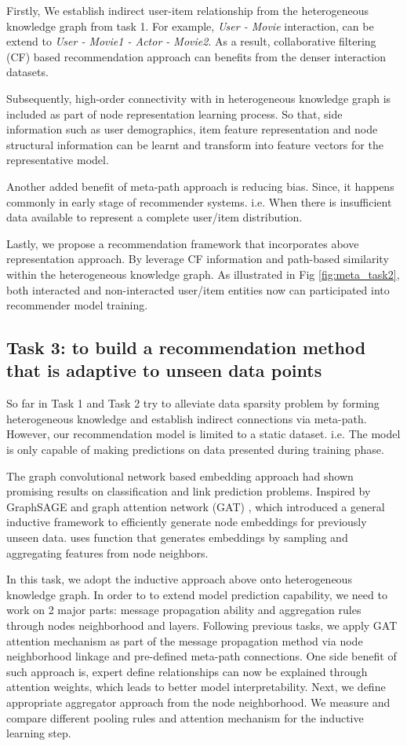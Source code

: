 Firstly, We establish indirect user-item relationship from the heterogeneous knowledge graph from task 1. For example, \textit{User - Movie} interaction, can be extend to \textit{User - Movie1 - Actor - Movie2}. As a result, collaborative filtering (CF) based recommendation approach can benefits from the denser interaction datasets. 

Subsequently, high-order connectivity with in heterogeneous knowledge graph is included as part of node representation learning process. So that, side information such as user demographics, item feature representation and node structural information can be learnt and transform into feature vectors for the representative model. 

Another added benefit of meta-path approach is reducing bias. Since, it happens commonly in early stage of recommender systems. i.e. When there is insufficient data available to represent a complete user/item distribution. 


Lastly, we propose a recommendation framework that incorporates above representation approach. By leverage CF information and path-based similarity within the heterogeneous knowledge graph. As illustrated in Fig \ref{fig:meta_task2}, both interacted and non-interacted user/item entities now can participated into recommender model training.

\subsection*{Task 3: to build a recommendation method that is adaptive to unseen data points}

So far in Task 1 and Task 2 try to alleviate data sparsity problem by forming heterogeneous knowledge and establish indirect connections via meta-path. However, our recommendation model is limited to a static dataset. i.e. The model is only capable of making predictions on data presented during training phase. 

The graph convolutional network based embedding approach had shown promising results on classification and link prediction problems. Inspired by GraphSAGE \citep{hamilton2017inductive} and graph attention network (GAT) \citep{velivckovic2017graph}, which introduced a general inductive framework to efficiently generate node embeddings for previously unseen data. \citet{hamilton2017inductive} uses function that generates embeddings by sampling and aggregating features from node neighbors.

In this task, we adopt the inductive approach above onto heterogeneous knowledge graph. In order to to extend model prediction capability, we need to work on 2 major parts: message propagation ability and aggregation rules through nodes neighborhood and layers. 
Following previous tasks, we apply GAT attention mechanism as part of the message propagation method via node neighborhood linkage and pre-defined meta-path connections. One side benefit of such approach is, expert define relationships can now be explained through attention weights, which leads to better model interpretability.
Next, we define appropriate aggregator approach from the node neighborhood. We measure and compare different pooling rules and attention mechanism for the inductive learning step.

